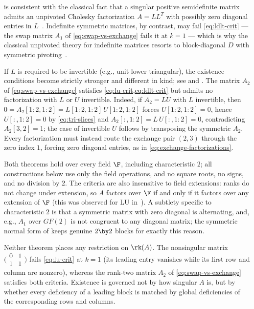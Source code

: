  is consistent with the classical fact that a singular
positive semidefinite matrix admits an unpivoted Cholesky factorization
$A = LL^T$ with possibly zero diagonal entries in
$L$~\cite{higham_cholesky_1990}.  Indefinite symmetric matrices, by
contrast, may fail \cref{eq:ldlt-crit} --- the swap matrix $A_1$ of
\cref{eq:swap-vs-exchange} fails it at $k=1$ --- which is why the classical
unpivoted theory for indefinite matrices resorts to block-diagonal $D$ with
symmetric pivoting~\cite{bunch_parlett_1971,bunch_kaufman_1977}.

\begin{remark}\label{rem:zeros}
  If $L$ is required to be invertible (e.g., unit lower triangular), the
  existence conditions become strictly stronger and different in kind; see
  \cite{dopico_multiple_2006} and \cite[Sec.~3]{darve_lu_2026}.  The matrix
  $A_2$ of \cref{eq:swap-vs-exchange} satisfies
  \cref{eq:lu-crit,eq:ldlt-crit} but admits no factorization with $L$ or
  $U$ invertible.  Indeed, if $A_2 = LU$ with $L$ invertible, then
  $0 = A_2[1:2,1:2] = L[1:2,1:2] \, U[1:2,1:2]$ forces $U[1:2,1:2] = 0$,
  hence $U[:,1:2] = 0$ by \cref{eq:tri-slices} and
  $A_2[:,1:2] = L \, U[:,1:2] = 0$, contradicting $A_2[3,2] = 1$; the case
  of invertible $U$ follows by transposing the symmetric $A_2$.  Every
  factorization must instead route the exchange pair $(2,3)$ through the
  zero index $1$, forcing zero diagonal entries, as in
  \cref{eq:exchange-factorizations}.
\end{remark}

\begin{remark}\label{rem:field}
  Both theorems hold over every field $\F$, including characteristic $2$;
  all constructions below use only the field operations, and no square
  roots, no signs, and no division by $2$.  The criteria are also
  insensitive to field extensions: ranks do not change under extension, so
  $A$ factors over $\F$ if and only if it factors over any extension of
  $\F$ (this was observed for LU in~\cite{johnson_okunev_2025}).
  A subtlety specific to characteristic $2$ is that a symmetric matrix with
  zero diagonal is alternating, and, e.g., $A_1$ over $GF(2)$ is not
  congruent to any diagonal matrix; the symmetric normal form of
   keeps genuine $2 \by 2$ blocks for exactly this
  reason.
\end{remark}

\begin{remark}\label{rem:singular}
  Neither theorem places any restriction on $\rk(A)$.  The nonsingular
  matrix $\bigl(\begin{smallmatrix} 0 & 1\\ 1 & 1\end{smallmatrix}\bigr)$
  fails \cref{eq:lu-crit} at $k = 1$ (its leading entry vanishes while its
  first row and column are nonzero), whereas the rank-two matrix $A_2$ of
  \cref{eq:swap-vs-exchange} satisfies both criteria.  Existence is
  governed not by how singular $A$ is, but by whether every deficiency of a
  leading block is matched by global deficiencies of the corresponding rows
  and columns.
\end{remark}
